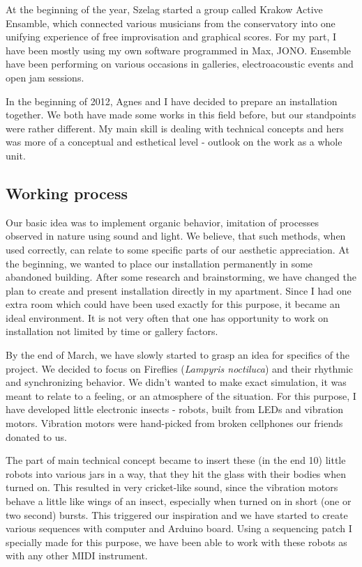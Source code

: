 \documentclass[12pt,a4paper,oneside]{report}
\begin{document}
At the beginning of the year, Szelag started a group called Krakow Active Ensamble, which connected various musicians from the conservatory into one unifying experience of free improvisation and graphical scores. For my part, I have been mostly using my own software programmed in Max, JONO. Ensemble have been performing on various occasions in galleries, electroacoustic events and open jam sessions.

In the beginning of 2012, Agnes and I have decided to prepare an installation together. We both have made some works in this field before, but our standpoints were rather different. My main skill is dealing with technical concepts and hers was more of a conceptual and esthetical level - outlook on the work as a whole unit. 

\subsection{Working process} Our basic idea was to implement organic behavior, imitation of processes observed in nature using sound and light. We believe, that such methods, when used correctly, can relate to some specific parts of our aesthetic appreciation. At the beginning, we wanted to place our installation permanently in some abandoned building. After some research and brainstorming, we have changed the plan to create and present installation directly in my apartment. Since I had one extra room which could have been used exactly for this purpose, it became an ideal environment. It is not very often that one has opportunity to work on installation not limited by time or gallery factors.

By the end of March, we have slowly started to grasp an idea for specifics of the project. We decided to focus on Fireflies (\emph{Lampyris noctiluca}) and their rhythmic and synchronizing behavior. We didn't wanted to make exact simulation, it was meant to relate to a feeling, or an atmosphere of the situation. For this purpose, I have developed little electronic insects - robots, built from LEDs and vibration motors. Vibration motors were hand-picked from broken cellphones our friends donated to us. 

The part of main technical concept became to insert these (in the end 10) little robots into various jars in a way, that they hit the glass with their bodies when turned on. This resulted in very cricket-like sound, since the vibration motors behave a little like wings of an insect, especially when turned on in short (one or two second) bursts. This triggered our inspiration and we have started to create various sequences with computer and Arduino board. Using a sequencing patch I specially made for this purpose, we have been able to work with these robots as with any other MIDI instrument.
\end{document}
